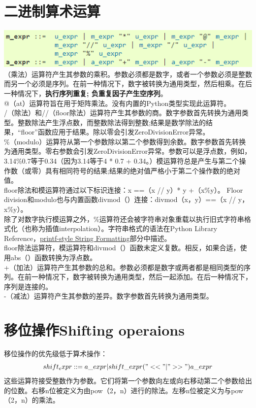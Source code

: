 \documentclass[10pt,UTF8]{ctexart}
\begin{document}
\section{二进制算术运算}
\includegraphics[scale=1]{binaryarithmetic.jpg} 
\indent *（乘法）运算符产生其参数的乘积。参数必须都是数字，或者一个参数必须是整数而另一个必须是序列。在前一种情况下，数字被转换为通用类型，然后相乘。在后一种情况下，\textbf{执行序列重复; 负重复因子产生空序列}。\\
\indent @（at）运算符旨在用于矩阵乘法。没有内置的Python类型实现此运算符。\\
\indent /（除法）和//（floor除法）运算符产生其参数的商。数字参数首先转换为通用类型。整数除法产生浮点数，而整数除法得到整数;结果是数学除法的结果，“floor”函数应用于结果。除以零会引发ZeroDivisionError异常。\\
\indent \%（modulo）运算符从第一个参数除以第二个参数得到余数。数字参数首先转换为通用类型。零右参数会引发ZeroDivisionError异常。参数可以是浮点数，例如，3.14\%0.7等于0.34（因为3.14等于4 * 0.7 + 0.34。）模运算符总是产生与第二个操作数（或零）具有相同符号的结果;结果的绝对值严格小于第二个操作数的绝对值。\\
\indent floor除法和模运算符通过以下标识连接：x ==（x // y）* y +（x\%y）。 Floor division和modulo也与内置函数divmod（）连接：divmod（x，y）==（x // y，x\%y）。\\
\indent 除了对数字执行模运算之外，\%运算符还会被字符串对象重载以执行旧式字符串格式化（也称为插值interpolation）。字符串格式的语法在Python Library Reference，\href{https://docs.python.org/3/library/stdtypes.html#old-string-formatting}{printf-style String Formatting}部分中描述。\\
\indent floor除法运算符，模运算符和divmod（）函数未定义复数。相反，如果合适，使用abs（）函数转换为浮点数。\\
\indent +（加法）运算符产生其参数的总和。参数必须都是数字或两者都是相同类型的序列。在前一种情况下，数字被转换为通用类型，然后一起添加。在后一种情况下，序列是连接的。\\
\indent  -（减法）运算符产生其参数的差异。数字参数首先转换为通用类型。
\section{移位操作Shifting operaions}
移位操作的优先级低于算术操作：\\
\[shift_expr ::= a\_expr | shift\_expr ("<<" | ">>") a\_expr\]
\indent 这些运算符接受整数作为参数。它们将第一个参数向左或向右移动第二个参数给出的位数。右移n位被定义为由pow（2，n）进行的除法。左移n位被定义为与pow（2，n）的乘法。
\end{document}
